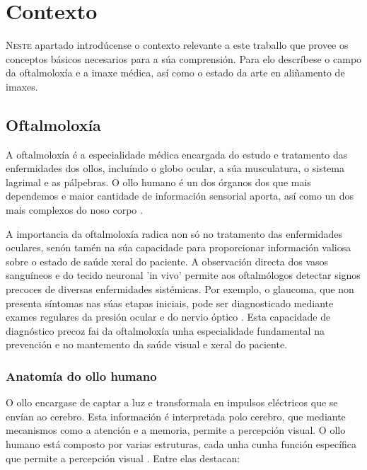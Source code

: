 \chapter{Contexto}
\label{chap:contexto}

\lettrine{N}{este} apartado introdúcense o contexto relevante a este traballo que provee os conceptos básicos necesarios para a súa comprensión.
Para elo descríbese o campo da oftalmoloxía e a imaxe médica, así como o estado da arte en aliñamento de imaxes.
\section{Oftalmoloxía}
\label{sec:Oftalmoloxía}
A oftalmoloxía é a especialidade médica encargada do estudo e tratamento das enfermidades dos ollos, incluíndo o globo ocular, a súa musculatura, o sistema lagrimal e as pálpebras.
O ollo humano é un dos órganos dos que mais dependemos e maior cantidade de información sensorial aporta, así como un dos mais complexos do noso corpo \cite{kanski2011clinical}.

A importancia da oftalmoloxía radica non só no tratamento das enfermidades oculares, senón tamén na súa capacidade para proporcionar información valiosa sobre o estado de saúde xeral do paciente. 
A observación directa dos vasos sanguíneos e do tecido neuronal 'in vivo' permite aos oftalmólogos detectar signos precoces de diversas enfermidades sistémicas.
 Por exemplo, o glaucoma, que non presenta síntomas nas súas etapas iniciais, pode ser diagnosticado mediante exames regulares da presión ocular e do nervio óptico \cite{importglaucoma}.
 Esta capacidade de diagnóstico precoz fai da oftalmoloxía unha especialidade fundamental na prevención e no mantemento da saúde visual e xeral do paciente.

 \subsection{Anatomía do ollo humano}
\label{subsec:Anatomía do ollo humano}
O ollo encargase de captar a luz e transformala en impulsos eléctricos que se envían ao cerebro.
 Esta información é interpretada polo cerebro, que mediante mecanismos como a atención e a memoria, permite a percepción visual. \cite{eyefunct}
 O ollo humano está composto por varias estruturas, cada unha cunha función específica que permite a percepción visual \cite{eyeanat}. Entre elas destacan:

